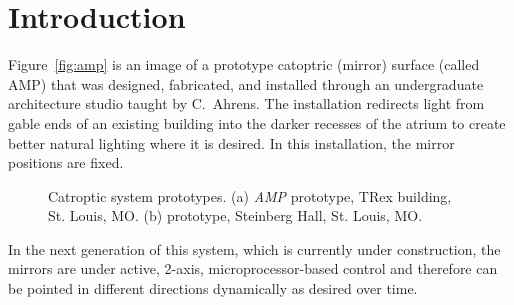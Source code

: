 \section{Introduction}
\label{sec:intro}


Figure~\ref{fig:amp} is an image of a prototype catoptric (mirror) surface
(called AMP) that was designed, fabricated, and installed through an
undergraduate architecture studio taught by C.~Ahrens. The installation
redirects light from gable ends of an existing building into the darker
recesses of the atrium to create better natural lighting where it is desired.
In this installation, the mirror positions are fixed.

\begin{figure}[ht]
\centering
{}
\qquad \qquad
{}
\caption{Catroptic system prototypes.
(a) \emph{AMP} prototype, TRex building, St. Louis, MO.
(b)  prototype, Steinberg Hall, St. Louis, MO.
}
\label{fig:proto}
\end{figure}

In the next generation of this system, which is currently under construction,
the mirrors are under active, 2-axis, microprocessor-based control and
therefore can be pointed in different directions dynamically as desired
over time.



